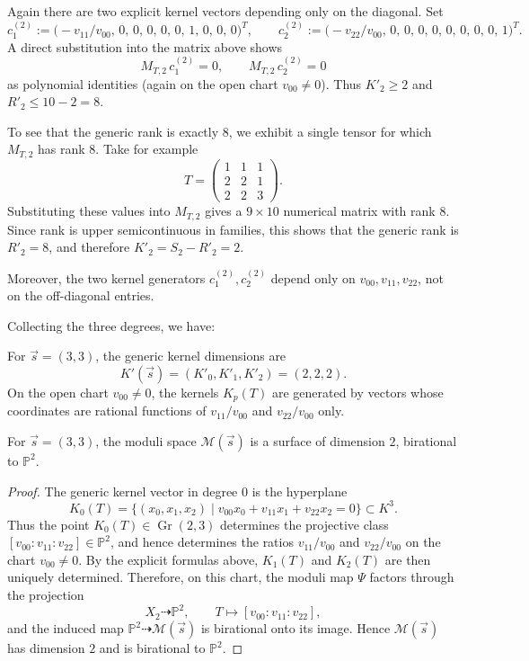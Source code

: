 Again there are two explicit kernel vectors depending only on the
diagonal. Set
\[
c^{(2)}_1 :=
\bigl(-v_{11}/v_{00},\, 0,\,0,\,0,\,0,\,0,\, 1,\,0,\,0,\,0\bigr)^T,
\qquad
c^{(2)}_2 :=
\bigl(-v_{22}/v_{00},\, 0,\,0,\,0,\,0,\,0,\, 0,\,0,\,0,\,1\bigr)^T.
\]
A direct substitution into the matrix above shows
\[
M_{T,2}\,c^{(2)}_1 = 0,
\qquad
M_{T,2}\,c^{(2)}_2 = 0
\]
as polynomial identities (again on the open chart $v_{00}\neq 0$).
Thus $K'_2 \ge 2$ and $R'_2 \le 10-2 = 8$.

To see that the generic rank is exactly $8$, we exhibit a single tensor
for which $M_{T,2}$ has rank $8$. Take for example
\[
T =
\begin{pmatrix}
1 & 1 & 1 \\
2 & 2 & 1 \\
2 & 2 & 3
\end{pmatrix}.
\]
Substituting these values into $M_{T,2}$ gives a $9\times 10$ numerical
matrix with rank $8$. Since rank is upper semicontinuous in families,
this shows that the generic rank is $R'_2=8$, and therefore
$K'_2 = S_2 - R'_2 = 2$.

Moreover, the two kernel generators $c^{(2)}_1,c^{(2)}_2$ depend only on
$v_{00},v_{11},v_{22}$, not on the off-diagonal entries.

\medskip

Collecting the three degrees, we have:

\begin{proposition}
For $\vec{s}=(3,3)$, the generic kernel dimensions are
\[
K'(\vec{s}) = (K'_0,K'_1,K'_2) = (2,2,2).
\]
On the open chart $v_{00}\neq 0$, the kernels $K_p(T)$ are generated by
vectors whose coordinates are rational functions of $v_{11}/v_{00}$ and
$v_{22}/v_{00}$ only.
\end{proposition}

\begin{corollary}
For $\vec{s}=(3,3)$, the moduli space $\mathcal{M}(\vec{s})$ is a surface
of dimension $2$, birational to $\mathbb{P}^2$.
\end{corollary}

\begin{proof}
The generic kernel vector in degree $0$ is the hyperplane
\[
K_0(T) = \{(x_0,x_1,x_2)\mid v_{00}x_0+v_{11}x_1+v_{22}x_2=0\}
\subset K^3.
\]
Thus the point $K_0(T) \in \operatorname{Gr}(2,3)$ determines the
projective class $[v_{00}:v_{11}:v_{22}] \in \mathbb{P}^2$, and hence
determines the ratios $v_{11}/v_{00}$ and $v_{22}/v_{00}$ on the chart
$v_{00}\neq 0$. By the explicit formulas above, $K_1(T)$ and $K_2(T)$
are then uniquely determined. Therefore, on this chart, the moduli map
$\Psi$ factors through the projection
\[
X_2 \dashrightarrow \mathbb{P}^2,\qquad
T \longmapsto [v_{00}:v_{11}:v_{22}],
\]
and the induced map $\mathbb{P}^2 \dashrightarrow \mathcal{M}(\vec{s})$
is birational onto its image. Hence $\mathcal{M}(\vec{s})$ has dimension
$2$ and is birational to $\mathbb{P}^2$.
\end{proof} 



